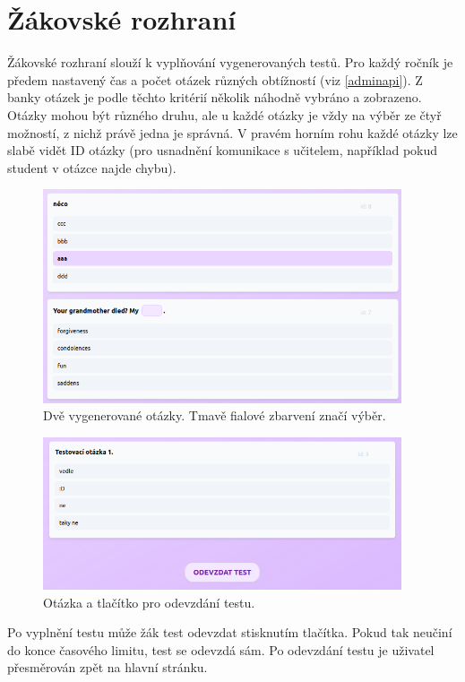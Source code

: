 \section{Žákovské rozhraní}

Žákovské rozhraní slouží k vyplňování vygenerovaných testů. Pro každý ročník je předem nastavený čas a počet otázek různých obtížností (viz \ref{adminapi}). Z banky otázek je podle těchto kritérií několik náhodně vybráno a zobrazeno. Otázky mohou být různého druhu, ale u každé otázky je vždy na výběr ze čtyř možností, z nichž právě jedna je správná. V pravém horním rohu každé otázky lze slabě vidět ID otázky (pro usnadnění komunikace s učitelem, například pokud student v otázce najde chybu).

\begin{figure}[H]
    \centering
    \includegraphics[width=400px]{images/01design/otazky.png}
    \caption{Dvě vygenerované otázky. Tmavě fialové zbarvení značí výběr.}
    \label{purplerect}
\end{figure}

\begin{figure}[H]
    \centering
    \includegraphics[width=400px]{images/01design/submit.png}
    \caption{Otázka a tlačítko pro odevzdání testu.}
\end{figure}

Po vyplnění testu může žák test odevzdat stisknutím tlačítka. Pokud tak neučiní do konce časového limitu, test se odevzdá sám. Po odevzdání testu je uživatel přesměrován zpět na hlavní stránku.

